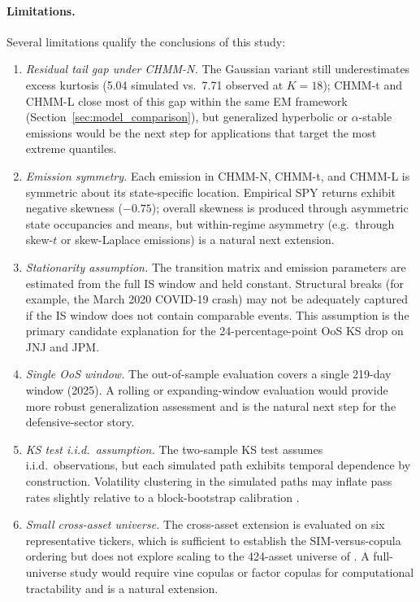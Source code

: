 \paragraph{Limitations.}
Several limitations qualify the conclusions of this study:
\begin{enumerate}
    \item \textit{Residual tail gap under CHMM-N.}
    The Gaussian variant still underestimates excess kurtosis (5.04 simulated vs.\ 7.71 observed at $K = 18$); CHMM-t and CHMM-L close most of this gap within the same EM framework (Section~\ref{sec:model_comparison}), but generalized hyperbolic or $\alpha$-stable emissions would be the next step for applications that target the most extreme quantiles.

    \item \textit{Emission symmetry.}
    Each emission in CHMM-N, CHMM-t, and CHMM-L is symmetric about its state-specific location.
    Empirical SPY returns exhibit negative skewness ($-0.75$); overall skewness is produced through asymmetric state occupancies and means, but within-regime asymmetry (e.g.\ through skew-$t$ or skew-Laplace emissions) is a natural next extension.

    \item \textit{Stationarity assumption.}
    The transition matrix and emission parameters are estimated from the full IS window and held constant.
    Structural breaks (for example, the March 2020 COVID-19 crash) may not be adequately captured if the IS window does not contain comparable events.
    This assumption is the primary candidate explanation for the 24-percentage-point OoS KS drop on JNJ and JPM.

    \item \textit{Single OoS window.}
    The out-of-sample evaluation covers a single 219-day window (2025).
    A rolling or expanding-window evaluation would provide more robust generalization assessment and is the natural next step for the defensive-sector story.

    \item \textit{KS test i.i.d.\ assumption.}
    The two-sample KS test assumes i.i.d.\ observations, but each simulated path exhibits temporal dependence by construction.
    Volatility clustering in the simulated paths may inflate pass rates slightly relative to a block-bootstrap calibration \cite{alswaidan2026hybrid}.

    \item \textit{Small cross-asset universe.}
    The cross-asset extension is evaluated on six representative tickers, which is sufficient to establish the SIM-versus-copula ordering but does not explore scaling to the 424-asset universe of \citet{alswaidan2026hybrid}.
    A full-universe study would require vine copulas or factor copulas for computational tractability and is a natural extension.


\end{enumerate}
